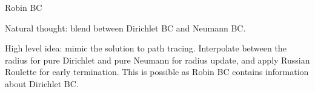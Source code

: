 \documentclass{beamer}
\begin{document}
\begin{frame}{Robin BC}

	Natural thought: blend between Dirichlet BC and Neumann BC.

	\vspace*{1em}
	High level idea: mimic the solution to path tracing. Interpolate between the radius for pure Dirichlet and pure Neumann for radius update, and apply Russian Roulette for early termination. This is possible as Robin BC contains information about Dirichlet BC.
\end{frame}








\thankframe
\end{document}
